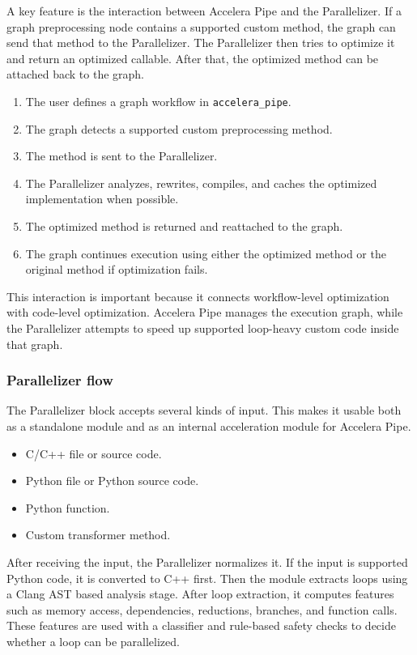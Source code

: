 \documentclass[12pt,a4paper]{report}
\begin{document}
A key feature is the interaction between Accelera Pipe and the Parallelizer. If
a graph preprocessing node contains a supported custom method, the graph can send
that method to the Parallelizer. The Parallelizer then tries to optimize it and
return an optimized callable. After that, the optimized method can be attached
back to the graph.

\begin{enumerate}
  \item The user defines a graph workflow in \texttt{accelera\_pipe}.
  \item The graph detects a supported custom preprocessing method.
  \item The method is sent to the Parallelizer.
  \item The Parallelizer analyzes, rewrites, compiles, and caches the optimized
  implementation when possible.
  \item The optimized method is returned and reattached to the graph.
  \item The graph continues execution using either the optimized method or the
  original method if optimization fails.
\end{enumerate}

This interaction is important because it connects workflow-level optimization
with code-level optimization. Accelera Pipe manages the execution graph, while
the Parallelizer attempts to speed up supported loop-heavy custom code inside
that graph.

\subsubsection*{Parallelizer flow}

The Parallelizer block accepts several kinds of input. This makes it usable both
as a standalone module and as an internal acceleration module for Accelera Pipe.

\begin{itemize}
  \item C/C++ file or source code.
  \item Python file or Python source code.
  \item Python function.
  \item Custom transformer method.
\end{itemize}

After receiving the input, the Parallelizer normalizes it. If the input is
supported Python code, it is converted to C++ first. Then the module extracts
loops using a Clang AST based analysis stage. After loop extraction, it computes
features such as memory access, dependencies, reductions, branches, and function
calls. These features are used with a classifier and rule-based safety checks to
decide whether a loop can be parallelized.
\end{document}
